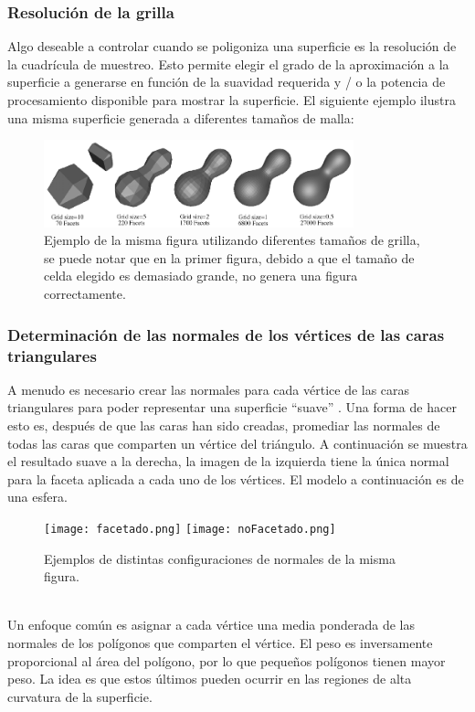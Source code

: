 \documentclass[12pt]{article}
\begin{document}
\subsubsection{Resolución de la grilla}
Algo deseable a controlar cuando se poligoniza una superficie es la resolución de la cuadrícula de muestreo. Esto permite elegir el grado de la aproximación a la superficie a generarse en función de la suavidad requerida y / o la potencia de procesamiento disponible para mostrar la superficie. El siguiente ejemplo ilustra una misma superficie generada a diferentes tamaños de malla:
\clearpage
\begin{figure}[h!]
\includegraphics[width=0.8\textwidth,center]{marchingcubes4.png}
\caption{Ejemplo de la misma figura utilizando diferentes tamaños de grilla, se puede notar que en la primer figura, debido a que el tamaño de celda elegido es demasiado grande, no genera una figura correctamente.}
\end{figure}
\subsubsection{Determinación de las normales de los vértices de las caras triangulares}
A menudo es necesario crear las normales para cada vértice de las caras triangulares para poder representar una superficie “suave” \cite{realtimerendering}. Una forma de hacer esto es, después de que las caras han sido creadas, promediar las normales de todas las caras que comparten un vértice del triángulo. A continuación se muestra el resultado suave a la derecha, la imagen de la izquierda tiene la única normal para la faceta aplicada a cada uno de los vértices. El modelo a continuación es de una esfera.\\
\begin{figure}[h]
\texttt{[image: facetado.png]}
\hfill
\texttt{[image: noFacetado.png]}
\caption{ Ejemplos de distintas configuraciones de normales de la misma figura.}
\label{ fig : surface }
\end{figure}
\\Un enfoque común es asignar a cada vértice una media ponderada de las normales de los polígonos que comparten el vértice. El peso es  inversamente proporcional al área del polígono, por lo que pequeños polígonos tienen mayor peso. La idea es que estos últimos pueden ocurrir en las regiones de alta curvatura de la superficie.
\end{document}
